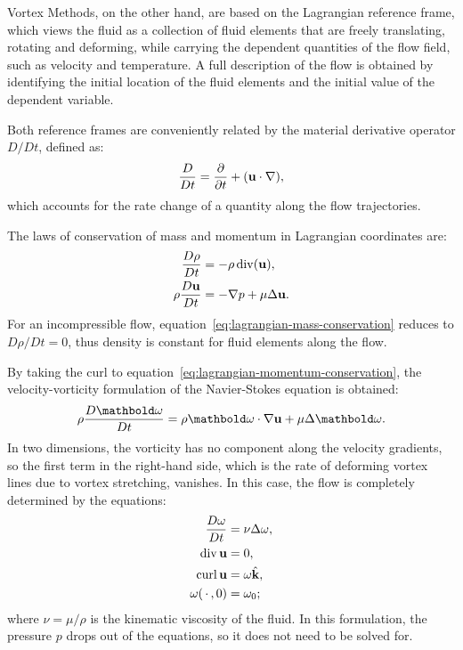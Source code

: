 Vortex Methods, on the other hand, are based on the Lagrangian reference frame,
which views the fluid as a collection of fluid elements
that are freely translating, rotating and deforming,
while carrying the dependent quantities of the flow field,
such as velocity and temperature.
A full description of the flow is obtained by
identifying the initial location of the fluid elements
and the initial value of the dependent variable.

Both reference frames are conveniently related
by the material derivative operator \(D/Dt\),
defined as:
\begin{equation}
  \frac{D}{Dt} = \frac{\partial}{\partial t} + (\mathbf u\cdot\nabla),
\end{equation}
which accounts for the rate change of a quantity along the flow trajectories.

The laws of conservation of mass and momentum in Lagrangian coordinates are:
\begin{align}
  \label{eq:lagrangian-mass-conservation}
  \frac{D\rho}{Dt} &= -\rho\operatorname{div}(\mathbf u), \\
  \label{eq:lagrangian-momentum-conservation}
  \rho\frac{D\mathbf u}{Dt} &= -\nabla p + \mu\Delta\mathbf u.
\end{align}
For an incompressible flow,
equation~\ref{eq:lagrangian-mass-conservation} reduces to \(D\rho/Dt = 0\),
thus density is constant for fluid elements along the flow.

By taking the curl to equation~\ref{eq:lagrangian-momentum-conservation},
the velocity-vorticity formulation of the Navier-Stokes equation is obtained:
\begin{equation}
  \label{eq:velocity-vorticity-navier-stokes}
  \rho\frac{D\mathbold\vort}{Dt} = \rho\mathbold\vort\cdot\nabla\vel +
                                   \mu\lapl\mathbold\vort.
\end{equation}
In two dimensions, the vorticity has no component along the velocity gradients,
so the first term in the right-hand side,
which is the rate of deforming vortex lines due to vortex stretching,
vanishes.  In this case, the flow is completely determined by the equations:
\begin{align}
  \frac{D\omega}{Dt} &= \nu\Delta\omega, \\
  \operatorname{div}\mathbf u &= 0, \\
  \operatorname{curl}\mathbf u &= \omega\hat{\mathbf k}, \\
  \omega(\,\cdot\,{}, 0) &= \omega_0;
\end{align}
where \(\nu = \mu/\rho\) is the kinematic viscosity of the fluid.
In this formulation, the pressure \(p\) drops out of the equations,
so it does not need to be solved for.

